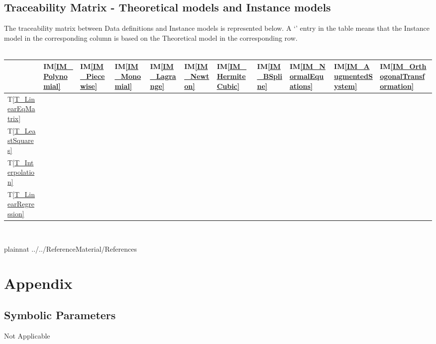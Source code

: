 \documentclass[12pt]{article}
\newcommand{\tref}[1]{T\ref{#1}}
\newcommand{\iref}[1]{IM\ref{#1}}
\begin{document}
\subsection{Traceability Matrix - Theoretical models and Instance models}
The traceability matrix between Data definitions and Instance models is represented below. A `\checkmark' entry in the table means that the Instance model in the corresponding column is based on the Theoretical model in the corresponding row.\\
~\newline
\begin{tabular}{|p{1.3cm}|p{1cm}|p{1cm}|p{1cm}|p{1cm}|p{1cm}|p{1cm}|p{1cm}|p{1cm}|p{1cm}|p{1cm}|}
	
	\hline
	&\iref{IM_Polynomial}  & \iref{IM_Piecewise} & \iref{IM_Monomial} & \iref{IM_Lagrange} & \iref{IM_Newton} & \iref{IM_HermiteCubic}  & \iref{IM_BSpline} & \iref{IM_NormalEquations} & \iref{IM_AugmentedSystem} & \iref{IM_OrthogonalTransformation}\\
	\hline
	\tref{T_LinearEqMatrix} &  &   & \checkmark  & \checkmark & \checkmark  & \checkmark    &  & \checkmark & \checkmark & \checkmark \\
	\hline
	\tref{T_LeastSquares} &  &   &   &   &   &    &  & \checkmark & \checkmark & \checkmark \\
	\hline
	\tref{T_Interpolation} & \checkmark & \checkmark  & \checkmark  & \checkmark  & \checkmark  & \checkmark   & \checkmark & & & \\
	\hline
	\tref{T_LinearRegression} &  &   &   &   &   &  &  & \checkmark & \checkmark & \checkmark  \\
	\hline
\end{tabular}\\


\newpage

 {plainnat}
 {../../ReferenceMaterial/References}

\newpage

\section{Appendix}



\subsection{Symbolic Parameters}
Not Applicable
\end{document}
